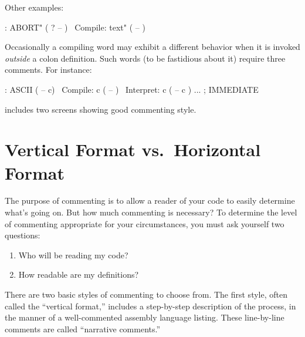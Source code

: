 Other examples:
\begin{Code}
: ABORT"  ( ? -- )
\ Compile:   text"   ( -- )
\end{Code}
Occasionally a compiling word may exhibit a different behavior when it
is invoked \emph{outside} a colon definition.  Such words (to be
fastidious about it) require three comments.  For instance:
\begin{Code}
: ASCII  ( -- c)
\ Compile:   c   ( -- )
\ Interpret:   c   ( -- c )
     ... ; IMMEDIATE
\end{Code}
 includes two screens showing good commenting style.

\section{Vertical Format vs.\ Horizontal Format}
The purpose of commenting is to allow a reader of your code to easily
determine what's going on.  But how much commenting is necessary? To
determine the level of commenting appropriate for your circumstances,
you must ask yourself two questions:

\begin{enumerate}
\item[] Who will be reading my code?
\item[] How readable are my definitions?
\end{enumerate}
There are two basic styles of commenting to choose from.  The first
style, often called the ``vertical format,'' includes a step-by-step
description of the process, in the manner of a well-commented assembly
language listing.  These line-by-line comments are called ``narrative
comments.''

